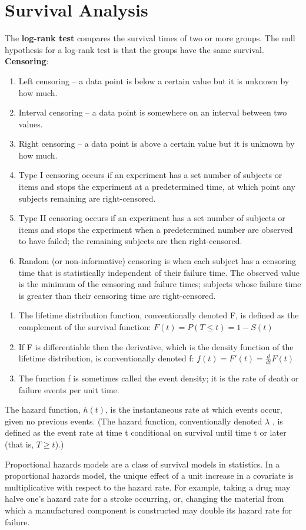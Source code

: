 \documentclass[11pt]{article}
\newcommand{\ulb}{\begin{enumerate}[label=\textbullet,topsep=0pt,itemsep=-0.5ex,partopsep=1ex,parsep=1ex]}
\newcommand{\ule}{\end{enumerate}\vspace{1mm}}
\begin{document}
\section{Survival Analysis}
\par The \textbf{log-rank test} compares the survival times of two or more groups. The null hypothesis for a log-rank test is that the groups have the same survival.
\\
\textbf{Censoring}:
\ulb
\item Left censoring – a data point is below a certain value but it is unknown by how much.
\item Interval censoring – a data point is somewhere on an interval between two values.
\item Right censoring – a data point is above a certain value but it is unknown by how much.
\item Type I censoring occurs if an experiment has a set number of subjects or items and stops the experiment at a predetermined time, at which point any subjects remaining are right-censored.
\item Type II censoring occurs if an experiment has a set number of subjects or items and stops the experiment when a predetermined number are observed to have failed; the remaining subjects are then right-censored.
\item Random (or non-informative) censoring is when each subject has a censoring time that is statistically independent of their failure time. The observed value is the minimum of the censoring and failure times; subjects whose failure time is greater than their censoring time are right-censored.
\ule
\ulb
\item The lifetime distribution function, conventionally denoted F, is defined as the complement of the survival function: $F(t) = P(T \leq t) = 1 - S(t)$
\item If F is differentiable then the derivative, which is the density function of the lifetime distribution, is conventionally denoted f: $f(t) = F'(t) = \frac{d}{dt}F(t)$
\item The function f is sometimes called the event density; it is the rate of death or failure events per unit time.
\ule
\par The hazard function, $h(t)$, is the instantaneous rate at which events occur, given no previous events. (The hazard function, conventionally denoted $\lambda$ , is defined as the event rate at time t conditional on survival until time t or later (that is, $T \geq t$).)
\par Proportional hazards models are a class of survival models in statistics. In a proportional hazards model, the unique effect of a unit increase in a covariate is multiplicative with respect to the hazard rate. For example, taking a drug may halve one's hazard rate for a stroke occurring, or, changing the material from which a manufactured component is constructed may double its hazard rate for failure.
\end{document}
